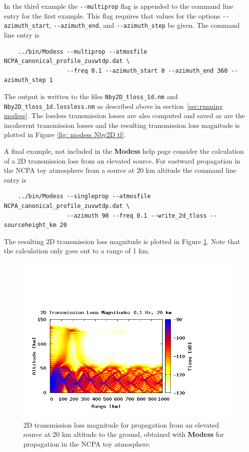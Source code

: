 In the third example the \verb+--multiprop+ flag is appended to the command line entry for the first example. This flag requires that values for the options \verb+--azimuth_start+, \verb+--azimuth_end+, and \verb+--azimuth_step+ be given. The command line entry is 
\begin{verbatim} 
    ../bin/Modess --multiprop --atmosfile NCPA_canonical_profile_zuvwtdp.dat \
                  --freq 0.1 --azimuth_start 0 --azimuth_end 360 --azimuth_step 1
\end{verbatim}
The output is written to the files \verb+Nby2D_tloss_1d.nm+ and \verb+Nby2D_tloss_1d.lossless.nm+ as described above in section~\ref{sec:running modess}. The lossless transmission losses are also computed and saved as are the incoherent transmission losses and the resulting transmission loss magnitude is plotted in Figure \ref{fig: modess Nby2D tl}. 

A final example, not included in the \textbf{Modess} help page consider the calculation of a 2D transmission loss from an elevated source. For eastward propagation in the NCPA toy atmosphere from a source at 20 km altitude the command line entry is 
\begin{verbatim} 
    ../bin/Modess --singleprop --atmosfile NCPA_canonical_profile_zuvwtdp.dat \ 
                  --azimuth 90 --freq 0.1 --write_2d_tloss --sourceheight_km 20
\end{verbatim}
The resulting 2D transmission loss magnitude is plotted in Figure \ref{fig: modess 2D elevated source}. Note that the calculation only goes out to a range of 1 km. 

\begin{figure}
\begin{center}
\includegraphics[scale=0.45,trim = 20 20 110 140,clip]{figs/modess_ex2_20km_source}
\end{center}
\caption{2D transmission loss magnitude for propagation from an elevated source at 20 km altitude to the ground, obtained with {\bf Modess} for propagation in the NCPA toy atmosphere.}
\label{fig: modess 2D elevated source}
\end{figure}
